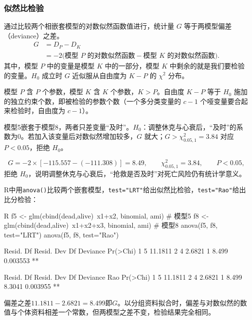\subsubsection{似然比检验}
通过比较两个相嵌套模型的对数似然函数值进行，统计量 $G$ 等于两模型偏差（deviance）之差。
\begin{align*}
G&=D_P-D_K\\
&=-2\bigl(\text{模型 $P$ 的对数似然函数}-\text{模型 $K$ 的对数似然函数}\bigr).
\end{align*}
其中，模型 $P$ 中的变量是模型 $K$ 中的一部分，模型 $K$ 中剩余的就是我们要检验的变量。$H_0$ 成立时 $G$ 近似服从自由度为 $K-P$ 的 $\chi^2$ 分布。
\begin{annotation}模型 $P$ 含 $P$ 个参数，模型 $K$ 含 $K$ 个参数，$K>P$。自由度 $K-P$ 等于 $H_0$ 施加的独立约束个数，即被检验的参数个数（一个多分类变量的 $c-1$ 个哑变量要合起来检验时，自由度为 $c-1$）。\end{annotation}
\begin{annotation}
模型5嵌套于模型8，两者只差变量“及时”。$H_0$：调整休克与心衰后，“及时”的系数为0。若加入该变量后对数似然增加较多，$G$ 就大；$G>\chi^2_{0.05,1}=3.84$ 对应 $P<0.05$，拒绝 $H_0$。
\end{annotation}
\[
G=-2\times[-115.557-(-111.308)]=8.49,\qquad
\chi^2_{0.05,1}=3.84,\qquad P<0.05,
\]
拒绝 $H_0$，说明调整休克与心衰后，“抢救是否及时”对死亡风险仍有统计学意义。

R中用\texttt{anova()}比较两个嵌套模型，\texttt{test="LRT"}给出似然比检验，\texttt{test="Rao"}给出比分检验：
\par\noindent
\begin{coursecode}{R}
f5 <- glm(cbind(dead,alive)~x1+x2,    binomial, ami)    # 模型5
f8 <- glm(cbind(dead,alive)~x1+x2+x3, binomial, ami)    # 模型8
anova(f5, f8, test="LRT")
anova(f5, f8, test="Rao")
\end{coursecode}
\begin{routput}
  Resid. Df Resid. Dev Df Deviance Pr(>Chi)   
1         5    11.1811                        
2         4     2.6821  1    8.499 0.003553 **

  Resid. Df Resid. Dev Df Deviance    Rao Pr(>Chi)   
1         5    11.1811                               
2         4     2.6821  1    8.499 8.3041 0.003955 **
\end{routput}
偏差之差$11.1811-2.6821=8.499$即$G$。以分组资料拟合时，偏差与对数似然的数值与个体资料相差一个常数，但两模型之差不变，检验结果完全相同。
